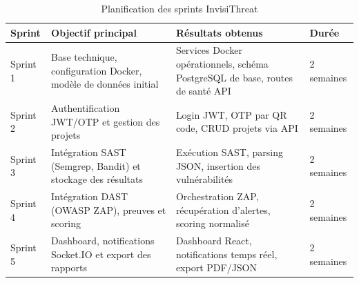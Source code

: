 \begin{table}[h]
\centering
\caption{Planification des sprints InvisiThreat}
\label{tab:sprints}
\begin{tabular}{l p{6cm} p{5.5cm} l}
\hline
Sprint & Objectif principal & Résultats obtenus & Durée \\
\hline
Sprint 1 & Base technique, configuration Docker, modèle de données initial & Services Docker opérationnels, schéma PostgreSQL de base, routes de santé API & 2 semaines \\
Sprint 2 & Authentification JWT/OTP et gestion des projets & Login JWT, OTP par QR code, CRUD projets via API & 2 semaines \\
Sprint 3 & Intégration SAST (Semgrep, Bandit) et stockage des résultats & Exécution SAST, parsing JSON, insertion des vulnérabilités & 2 semaines \\
Sprint 4 & Intégration DAST (OWASP ZAP), preuves et scoring & Orchestration ZAP, récupération d'alertes, scoring normalisé & 2 semaines \\
Sprint 5 & Dashboard, notifications Socket.IO et export des rapports & Dashboard React, notifications temps réel, export PDF/JSON & 2 semaines \\
\hline
\end{tabular}
\end{table}
